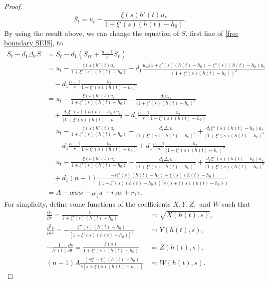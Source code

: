 \documentclass[11pt]{amsart}
\numberwithin{equation}{section}
\theoremstyle{plain}
\theoremstyle{definition}
\begin{document}
\begin{proof}
\begin{equation*}
			S_t=u_t-\frac{\xi(s)h'(t)u_s}{1+\xi'(s)(h(t)-h_0)}.
		\end{equation*}
		By using the result above, we can change the equation of $S$, first line of \cref{free boundary SEIS}, to
		\begin{equation*}
			\begin{aligned}
				S_t-d_1\Delta_rS &=S_t-d_1\left(S_{rr}+\frac{n-1}{r}S_r\right)
				\\
				&=u_t-\frac{\xi(s)h'(t)u_s}{1+\xi'(s)(h(t)-h_0)}
				-d_1\frac{u_{ss}(1+\xi'(s)(h(t)-h_0)-\xi''(s)(h(t)-h_0)u_s}{(1+\xi'(s)(h(t)-h_0))^3}
				\\
				&\quad -d_1\frac{n-1}{r}\frac{u_s}{1+\xi'(s)(h(t)-h_0)}
				\\
				&=u_t-\frac{\xi(s)h'(t)u_s}{1+\xi'(s)(h(t)-h_0)}-\frac{d_1 u_{ss}}{(1+\xi'(s)(h(t)-h_0)^2}
				\\
				&\quad +\frac{d_1\xi''(s)(h(t)-h_0)u_s}{(1+\xi'(s)(h(t)-h_0)^3}-d_1 \frac{n-1}{r}\frac{u_s}{1+\xi'(s)(h(t)-h_0)}
				\\
				&=u_t-\frac{\xi(s)h'(t)u_s}{1+\xi'(s)(h(t)-h_0)}-\frac{d_1 \Delta_s u}{(1+\xi'(s)(h(t)-h_0)^2}
				+\frac{d_1\xi''(s)(h(t)-h_0)u_s}{(1+\xi'(s)(h(t)-h_0)^3}\\
				&\quad -d_1 \frac{n-1}{r}\frac{u_s}{1+\xi'(s)(h(t)-h_0)}
				+d_1\frac{n-1}{s}\frac{u_s}{(1+\xi'(s)(h(t)-h_0)^2}
				\\
				&=u_t-\frac{\xi(s)h'(t)u_s}{1+\xi'(s)(h(t)-h_0)}-\frac{d_1 \Delta_s u}{(1+\xi'(s)(h(t)-h_0)^2}
				+\frac{d_1\xi''(s)(h(t)-h_0)u_s}{(1+\xi'(s)(h(t)-h_0)^3}
				\\
				&\quad +d_1(n-1)\frac{-s\xi'(s)(h(t)-h_0)+\xi(s)(h(t)-h_0)}{(1+\xi'(s)(h(t)-h_0))^2s(s+\xi(s)(h(t)-h_0))}
				\\
				&=A-\alpha uw-\mu_1u+r_2w+r_1v.
			\end{aligned}
		\end{equation*}
		For simplicity, define some functions of the coefficients $X, Y, Z,$ and $W$ such that
		\begin{align*}
			\frac{\partial s}{\partial r}=\frac{1}{1+\xi'(s)(h(t)-h_0)}&\eqqcolon \sqrt{X(h(t),s)},
			\\
			\frac{\partial^2s}{\partial r^2}=-\frac{\xi''(s)(h(t)-h_0)}{[1+\xi'(s)(h(t)-h_0)]^3}&\eqqcolon Y(h(t),s),
			\\
			-\frac{1}{h'(t)}\frac{\partial s}{\partial t}=\frac{\xi(s)}{1+\xi'(s)(h(t)-h_0)} &\eqqcolon Z(h(t),s),
			\\
			(n-1)A\frac{(s\xi'-\xi)(h(t)-h_0)}{s[s+\xi(s)(h(t)-h_0)]} &\eqqcolon W(h(t),s).

\end{align*}
\end{proof}
\end{document}
